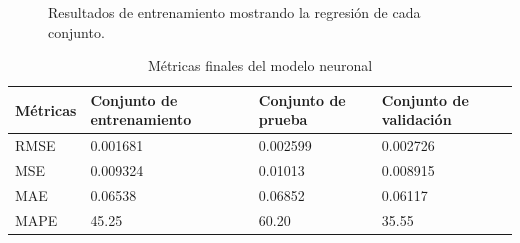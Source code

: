 \documentclass[12pt]{article}
\begin{document}
\begin{figure}[h!]
	\centering
	\captionsetup{justification=centering}
	\caption{Resultados de entrenamiento mostrando la regresión de cada conjunto.}
\end{figure}
\begin{table}[h!]
	\centering
	\caption{Métricas finales del modelo neuronal}
	\begin{tabular}{|l|l|l|l|}
		\hline
		Métricas & Conjunto de entrenamiento & Conjunto de prueba & Conjunto de validación \\ \hline
		RMSE     & 0.001681                  & 0.002599           & 0.002726               \\ \hline
		MSE      & 0.009324                  & 0.01013            & 0.008915               \\ \hline
		MAE      & 0.06538                   & 0.06852            & 0.06117                \\ \hline
		MAPE     & 45.25                     & 60.20              & 35.55                  \\ \hline
	\end{tabular}
\end{table}
\end{document}
